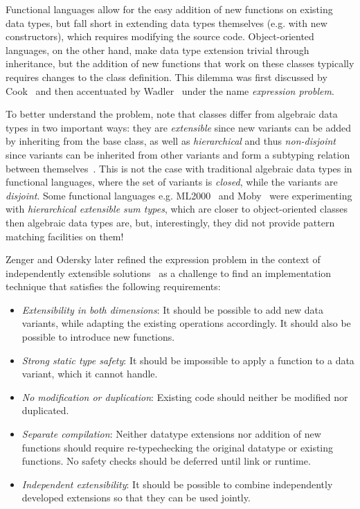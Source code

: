 Functional languages allow for the easy addition of new functions on existing data 
types, but fall short in extending data types themselves (e.g. with new constructors), 
which requires modifying the source code. Object-oriented languages, on the 
other hand, make data type extension trivial through inheritance, but the addition 
of new functions that work on these classes typically requires changes to the class 
definition. This dilemma was first discussed by Cook~\cite{Cook90} and then 
accentuated by Wadler~\cite{exprproblem} under the name \emph{expression problem}.

To better understand the problem, note that classes differ from algebraic data 
types in two important ways: they are \emph{extensible} since new variants can 
be added by inheriting from the base class, as well as \emph{hierarchical} and 
thus \emph{non-disjoint} since variants can be inherited from other variants and 
form a subtyping relation between themselves~\cite{Glew99}. This is not the case 
with traditional algebraic data types in functional languages, where the set of 
variants is \emph{closed}, while the variants are \emph{disjoint}. Some 
functional languages e.g. ML2000~\cite{ML2000} and Moby~\cite{Moby} were 
experimenting with \emph{hierarchical extensible sum types}, which are closer to 
object-oriented classes then algebraic data types are, but, interestingly, they 
did not provide pattern matching facilities on them!

Zenger and Odersky later refined the expression problem in the context of 
independently extensible solutions~\cite{fool12} as a challenge to find an 
implementation technique that satisfies the following requirements:

\begin{itemize}
\setlength{\itemsep}{0pt}
\setlength{\parskip}{0pt}
\item \emph{Extensibility in both dimensions}: It should be possible to add new 
      data variants, while adapting the existing operations accordingly. It 
      should also be possible to introduce new functions. 
\item \emph{Strong static type safety}: It should be impossible to apply a 
      function to a data variant, which it cannot handle. 
\item \emph{No modification or duplication}: Existing code should neither be 
      modified nor duplicated.
\item \emph{Separate compilation}: Neither datatype extensions nor addition of 
      new functions should require re-typechecking the original datatype or 
      existing functions. No safety checks should be deferred until link or 
      runtime.
\item \emph{Independent extensibility}: It should be possible to combine 
      independently developed extensions so that they can be used jointly.
\end{itemize}

